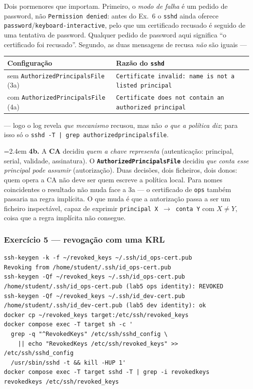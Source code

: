 \documentclass[a4paper,11pt]{article}
\newenvironment{answer}[1]{%
  \par\addvspace{7pt}\noindent
  \hangindent=2.4em\hangafter=1
  {\color{sscnblue}\bfseries #1\hspace{0.55em}}\ignorespaces}
  {\par\addvspace{5pt}}
\newcommand{\cmd}[1]{\textcolor{sscnblue}{\texttt{#1}}}
\begin{document}
Dois pormenores que importam. Primeiro, o \emph{modo de falha} \'e um pedido de password,
n\~ao \cmd{Permission denied}: antes do Ex.\ 6 o \cmd{sshd} ainda oferece
\cmd{password}/\cmd{keyboard-interactive}, pelo que um certificado recusado \'e seguido de
uma tentativa de password. Qualquer pedido de password aqui significa ``o certificado foi
recusado''. Segundo, as duas mensagens de recusa \emph{n\~ao} s\~ao iguais ---

\begin{center}\small
\begin{tabular}{@{}ll@{}}
\toprule
Configura\c{c}\~ao & Raz\~ao do \cmd{sshd} \\
\midrule
sem \cmd{AuthorizedPrincipalsFile} (3a) & \cmd{Certificate invalid: name is not a listed principal} \\
com \cmd{AuthorizedPrincipalsFile} (4a) & \cmd{Certificate does not contain an authorized principal} \\
\bottomrule
\end{tabular}
\end{center}

--- logo o log revela \emph{que mecanismo} recusou, mas n\~ao \emph{o que a pol\'itica diz};
para isso s\'o o \cmd{sshd -T | grep authorizedprincipalsfile}.

\begin{answer}{4b.}
A \textbf{CA} decidiu \emph{quem a chave representa} (autentica\c{c}\~ao: principal,
serial, validade, assinatura). O \textbf{\cmd{AuthorizedPrincipalsFile}} decidiu
\emph{que conta esse principal pode assumir} (autoriza\c{c}\~ao). Duas decis\~oes, dois
ficheiros, dois donos: quem opera a CA n\~ao deve ser quem escreve a pol\'itica local.
Para nomes coincidentes o resultado n\~ao muda face a 3a --- o certificado de \cmd{ops}
tamb\'em passaria na regra impl\'icita. O que muda \'e que a autoriza\c{c}\~ao passa a ser
um ficheiro inspect\'avel, capaz de exprimir \cmd{principal X $\rightarrow$ conta Y} com
$X\neq Y$, coisa que a regra impl\'icita n\~ao consegue.
\end{answer}

\subsubsection{Exerc\'icio 5 --- revoga\c{c}\~ao com uma KRL}

\begin{lstlisting}
ssh-keygen -k -f ~/revoked_keys ~/.ssh/id_ops-cert.pub
Revoking from /home/student/.ssh/id_ops-cert.pub
ssh-keygen -Qf ~/revoked_keys ~/.ssh/id_ops-cert.pub
/home/student/.ssh/id_ops-cert.pub (lab5 ops identity): REVOKED
ssh-keygen -Qf ~/revoked_keys ~/.ssh/id_dev-cert.pub
/home/student/.ssh/id_dev-cert.pub (lab5 dev identity): ok
docker cp ~/revoked_keys target:/etc/ssh/revoked_keys
docker compose exec -T target sh -c '
  grep -q "^RevokedKeys" /etc/ssh/sshd_config \
    || echo "RevokedKeys /etc/ssh/revoked_keys" >> /etc/ssh/sshd_config
  /usr/sbin/sshd -t && kill -HUP 1'
docker compose exec -T target sshd -T | grep -i revokedkeys
revokedkeys /etc/ssh/revoked_keys
\end{lstlisting}
\end{document}
